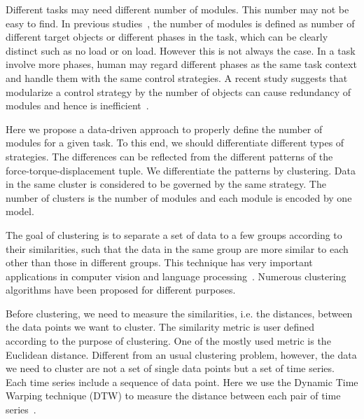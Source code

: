 Different tasks may need different number of modules. This number may not be easy to find. In previous studies~\cite{sugimoto2012emosaic,haruno2001mosaic}, the number of modules is defined as number of different target objects or different phases in the task, which can be clearly distinct such as no load or on load. However this is not always the case. In a task involve more phases, human may regard different phases as the same task context and handle them with the same control strategies. A recent study suggests that modularize a control strategy by the number of objects can cause redundancy of modules and hence is inefficient~\cite{lallee2009}.

Here we propose a data-driven approach to properly define the number of modules for a given task.
To this end, we should differentiate different types of strategies. The differences can be reflected from the different patterns of the force-torque-displacement tuple. We differentiate the patterns by clustering. Data in the same cluster is considered to be governed by the same strategy. The number of clusters is the number of modules and each module is encoded by one model.


The goal of clustering is to separate a set of data to a few groups according to their similarities, such that the data in the same group are more similar to each other than those in different groups. This technique has very important applications in computer vision and language processing~\cite{warren2005clustering}. Numerous clustering algorithms have been proposed for different purposes.

Before clustering, we need to measure the similarities, i.e. the distances, between the data points we want to cluster. The similarity metric is user defined according to the purpose of clustering. One of the mostly used metric is the Euclidean distance. Different from an usual clustering problem, however, the data we need to cluster are not a set of single data points but a set of time series. Each time series include a sequence of data point. Here we use the Dynamic Time Warping technique (DTW) to measure the distance between each pair of time series~\cite{berndt1994using}.

